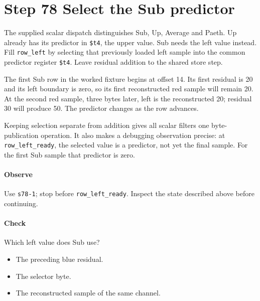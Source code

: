 \section{Step 78 Select the Sub predictor}
The supplied scalar dispatch distinguishes Sub, Up, Average and Paeth. Up already has its predictor in \texttt{\$t4}, the upper value. Sub needs the left value instead. Fill \texttt{row\_left} by selecting that previously loaded left sample into the common predictor register \texttt{\$t4}. Leave residual addition to the shared store step.

The first Sub row in the worked fixture begins at offset 14. Its first residual is 20 and its left boundary is zero, so its first reconstructed red sample will remain 20. At the second red sample, three bytes later, left is the reconstructed 20; residual 30 will produce 50. The predictor changes as the row advances.

Keeping selection separate from addition gives all scalar filters one byte-publication operation. It also makes a debugging observation precise: at \texttt{row\_left\_ready}, the selected value is a predictor, not yet the final sample. For the first Sub sample that predictor is zero.

\paragraph{Observe} Use \texttt{s78-1}; stop before \texttt{row\_left\_ready}. Inspect the state described above before continuing.

\paragraph{Check} Which left value does Sub use?
\begin{itemize}
  \item[A.] The preceding blue residual.
  \item[B.] The selector byte.
  \item[C.] The reconstructed sample of the same channel.
\end{itemize}
